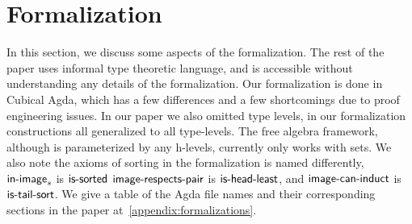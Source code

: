 \section{Formalization}
\label{sec:formalization}

In this section, we discuss some aspects of the formalization.
The rest of the paper uses informal type theoretic language,
and is accessible without understanding any details of the formalization.
Our formalization is done in Cubical Agda, which has a few differences and a few
shortcomings due to proof engineering issues.
In our paper we also omitted type levels, in our formalization constructions
all generalized to all type-levels. The free algebra framework, although is
parameterized by any h-levels, currently only works with sets.
We also note the axioms of sorting in the formalization is named differently,
$\operatorname{\mathsf{in-image}}_s$ is $\operatorname{\mathsf{is-sorted}}$
$\operatorname{\mathsf{image-respects-pair}}$ is $\operatorname{\mathsf{is-head-least}}$, and
$\operatorname{\mathsf{image-can-induct}}$ is $\operatorname{\mathsf{is-tail-sort}}$.
We give a table of the Agda file names and their corresponding sections in the paper
at~\cref{appendix:formalizations}.


